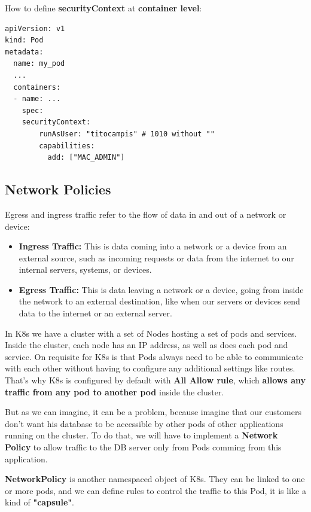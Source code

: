 \documentclass{article}
\newenvironment{codetemplate}[1][]{%
  \mybasecolorbox[#1]
  \itshape
}{%
  \endmybasecolorbox
}
\begin{document}
How to define \textbf{securityContext} at \textbf{container level}:
\begin{codetemplate}{}
\begin{verbatim}
apiVersion: v1
kind: Pod
metadata:
  name: my_pod
  ...
  containers:
  - name: ...
    spec:
    securityContext:
        runAsUser: "titocampis" # 1010 without ""
        capabilities:
          add: ["MAC_ADMIN"]
\end{verbatim}
\end{codetemplate}

\subsection{Network Policies}
Egress and ingress traffic refer to the flow of data in and out of a network or device:
\begin{itemize}
    \item \textbf{Ingress Traffic:} This is data coming into a network or a device from an external source, such as incoming requests or data from the internet to our internal servers, systems, or devices.
    \item \textbf{Egress Traffic:} This is data leaving a network or a device, going from inside the network to an external destination, like when our servers or devices send data to the internet or an external server.
\end{itemize}

In K8s we have a cluster with a set of Nodes hosting a set of pods and services. Inside the cluster, each node has an IP address, as well as does each pod and service. On requisite for K8s is that Pods always need to be able to communicate with each other
without having to configure any additional settings like routes. That's why K8s is configured by default with \textbf{All Allow rule}, which \textbf{allows any traffic from any pod to another pod} inside the cluster.

But as we can imagine, it can be a problem, because imagine that our customers don't want his database to be accessible by other pods of other applications running on the cluster. To do that, we will have to implement a \textbf{Network Policy} to allow traffic to the DB server only from Pods comming from this application.

\textbf{NetworkPolicy} is another namespaced object of K8s. They can be linked to one or more pods, and we can define rules to control the traffic to this Pod, it is like a kind of \textbf{"capsule"}.
\end{document}
